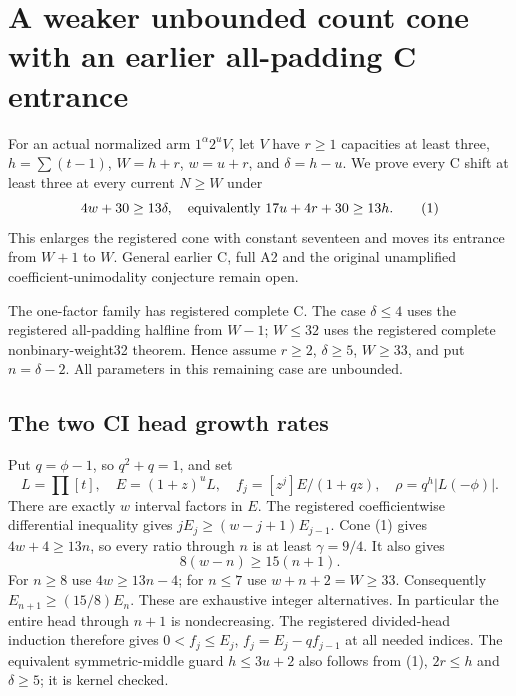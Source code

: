 \section{A weaker unbounded count cone with an earlier all-padding C entrance}
For an actual normalized arm $1^\alpha2^uV$, let $V$ have $r\ge1$
capacities at least three, $h=\sum(t-1)$, $W=h+r$, $w=u+r$, and
$\delta=h-u$. We prove every C shift at least three at every current
$N\ge W$ under
\[
               4w+30\ge13\delta,
       \quad\hbox{equivalently }17u+4r+30\ge13h.       \tag{1}
\]
This enlarges the registered cone with constant seventeen and moves
its entrance from $W+1$ to $W$. General earlier C, full A2 and the
original unamplified coefficient-unimodality conjecture remain open.

The one-factor family has registered complete C. The case
$\delta\le4$ uses the registered all-padding halfline from $W-1$;
$W\le32$ uses the registered complete nonbinary-weight32 theorem.
Hence assume $r\ge2$, $\delta\ge5$, $W\ge33$, and put $n=\delta-2$.
All parameters in this remaining case are unbounded.

\subsection*{The two CI head growth rates}
Put $q=\phi-1$, so $q^2+q=1$, and set
\[
 L=\prod[t],\quad E=(1+z)^uL,\quad
 f_j=[z^j]E/(1+qz),\quad \rho=q^h|L(-\phi)|.
\]
There are exactly $w$ interval factors in $E$. The registered
coefficientwise differential inequality gives
$jE_j\ge(w-j+1)E_{j-1}$.
Cone (1) gives $4w+4\ge13n$, so every ratio through $n$ is at
least $\gamma=9/4$. It also gives
\[
                 8(w-n)\ge15(n+1).                 \tag{2}
\]
For $n\ge8$ use $4w\ge13n-4$; for $n\le7$ use $w+n+2=W\ge33$.
Consequently $E_{n+1}\ge(15/8)E_n$. These are exhaustive integer
alternatives. In particular the entire head through $n+1$ is
nondecreasing. The registered divided-head induction therefore gives
$0<f_j\le E_j$, $f_j=E_j-qf_{j-1}$ at all needed indices.
The equivalent symmetric-middle guard $h\le3u+2$ also follows from
(1), $2r\le h$ and $\delta\ge5$; it is kernel checked.

